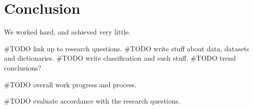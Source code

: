 \chapter{Conclusion}\label{conclusion}
We worked hard, and achieved very little.


#TODO link up to research questions. 
#TODO write stuff about data, datasets and dictionaries.
#TODO write classification and such stuff. 
#TODO trend conclusions?

#TODO overall work progress and process. 

#TODO evaluate accordance with the research questions.

